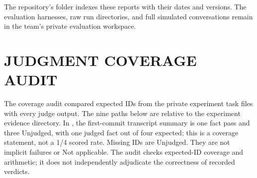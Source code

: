 The repository's  folder indexes these reports with their dates and versions. The evaluation harnesses, raw run directories, and full simulated conversations remain in the team's private evaluation workspace.

\chapter{JUDGMENT COVERAGE AUDIT}
\label{app:missing}

The coverage audit compared expected IDs from the private experiment task files with every judge output. The nine paths below are relative to the experiment evidence directory. In , the first-commit transcript summary is one fact pass and three Unjudged, with one judged fact out of four expected; this is a coverage statement, not a 1/4 scored rate. Missing IDs are Unjudged. They are not implicit failures or Not applicable. The audit checks expected-ID coverage and arithmetic; it does not independently adjudicate the correctness of recorded verdicts.

